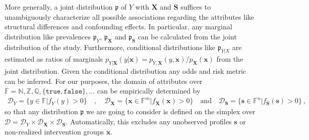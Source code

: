 \documentclass[10pt]{article}
\newcommand{\equ}[1]{\begin{gather} #1 \end{gather}}
\newcommand{\quads}[1]{\quad #1 \quad}
\newcommand{\qand}{\quad \text{and} \quad}
\newcommand{\prob}[1]{\mathfrak{#1}}
\begin{document}
%
More generally, a joint distribution $\prob p$ of $Y$ with $\boldsymbol X$ and $\boldsymbol S$ %
suffices to  unambiguously characterize  all possible associations regarding the attributes like structural differences and confounding effects. 
%
In particular, any marginal distribution like prevalences $\prob p_Y$, $\prob p_{\boldsymbol X}$ and $\prob p_{\boldsymbol S}$ can be calculated from the joint distribution of the study. 
Furthermore, conditional distributions like $\prob p_{Y\vert X}$ are estimated as ratios of marginals $ p_{Y\vert \boldsymbol X}(y\vert \boldsymbol x) = p_{Y, \boldsymbol X}(y, \boldsymbol x) / p_{\boldsymbol X}(\boldsymbol x)$ from the joint distribution.
Given the conditional distribution %
%
any odds and risk metric can be inferred.
%
For our purposes, the domain of attributes over $\mathbb F=\mathbb N,\mathbb Z,\mathbb Q,\{\texttt{true},\texttt{false}\},\dots$ can be empirically determined by
\equ{
\mathcal D_Y = \{y\in\mathbb F \vert f_Y(y)>0\} 
\quads{,} 
\mathcal D_{\boldsymbol X} = \{\boldsymbol x\in\mathbb F^m \vert f_{\boldsymbol X}(\boldsymbol x)>0\} 
\qand
\mathcal D_{\boldsymbol S} = \{\boldsymbol s\in\mathbb F^n \vert f_{\boldsymbol S}(\boldsymbol s)>0\} 
~,
}
so that any distribution $\prob p$ we are going to consider is defined on the simplex over $\mathcal D=\mathcal D_Y \times \mathcal D_{\boldsymbol X}\times\mathcal D_{\boldsymbol S}$. Automatically, this excludes any unobserved profiles $\boldsymbol s$ or non-realized intervention groups $\boldsymbol x$.
\end{document}
